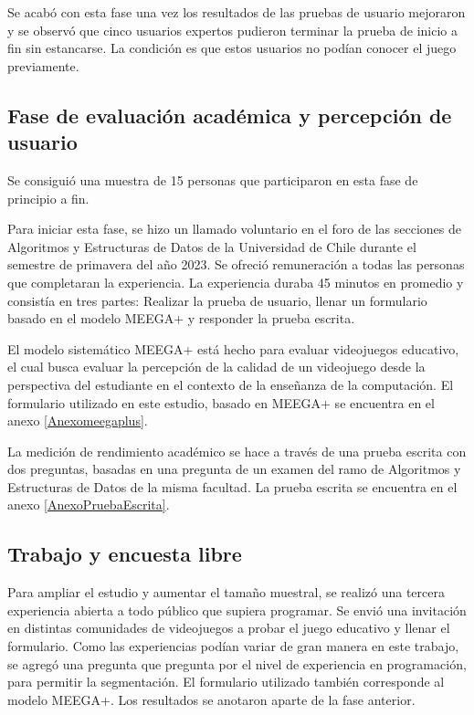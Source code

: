 Se acabó con esta fase una vez los resultados de las pruebas de usuario mejoraron y se observó que cinco usuarios expertos pudieron terminar la prueba de inicio a fin sin estancarse. La condición es que estos usuarios no podían conocer el juego previamente. 


\subsection{Fase de evaluación académica y percepción de usuario}

Se consiguió una muestra de 15 personas que participaron en esta fase de principio a fin.

Para iniciar esta fase, se hizo un llamado voluntario en el foro de las secciones de Algoritmos y Estructuras de Datos de la Universidad de Chile durante el semestre de primavera del año 2023. Se ofreció remuneración a todas las personas que completaran la experiencia. La experiencia duraba 45 minutos en promedio y consistía en tres partes: Realizar la prueba de usuario, llenar un formulario basado en el modelo MEEGA+ \cite{meegaplus} y responder la prueba escrita. %

El modelo sistemático MEEGA+ \cite{meegaplus} está hecho para evaluar videojuegos educativo, el cual busca evaluar la percepción de la calidad de un videojuego desde la perspectiva del estudiante en el contexto de la enseñanza de la computación.  El formulario utilizado en este estudio, basado en MEEGA+ \cite{meegaplus} se encuentra en el anexo \ref{Anexomeegaplus}.

La medición de rendimiento académico se hace a través de una prueba escrita con dos preguntas, basadas en una pregunta de un examen del ramo de Algoritmos y Estructuras de Datos de la misma facultad. La prueba escrita se encuentra en el anexo \ref{AnexoPruebaEscrita}.

\subsection{Trabajo y encuesta libre}


Para ampliar el estudio y aumentar el tamaño muestral, se realizó una tercera experiencia abierta a todo público que supiera programar. Se envió una invitación en distintas comunidades de videojuegos a probar el juego educativo y llenar el formulario. Como las experiencias podían variar de gran manera en este trabajo, se agregó una pregunta que pregunta por el nivel de experiencia en programación, para permitir la segmentación. El formulario utilizado también corresponde al modelo MEEGA+. Los resultados se anotaron aparte de la fase anterior.



